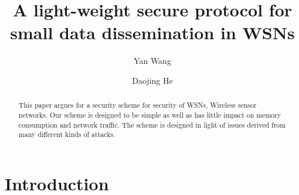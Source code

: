 \documentclass[lnicst,sechang,a4paper]{svmultln}
\begin{document}
\mainmatter  %

\title{A light-weight secure protocol for small data dissemination in WSNs}


%
%
\author{Yan Wang%
\and Daojing He}  %


%
%

\maketitle


\begin{abstract}


This paper argues for a security scheme for security of WSNs, Wireless sensor networks. Our scheme is designed to be simple as well as has little impact on memory consumption and network traffic. The scheme is designed in light of issues derived from many different kinds of attacks.

\end{abstract}
\section{Introduction}
\end{document}
